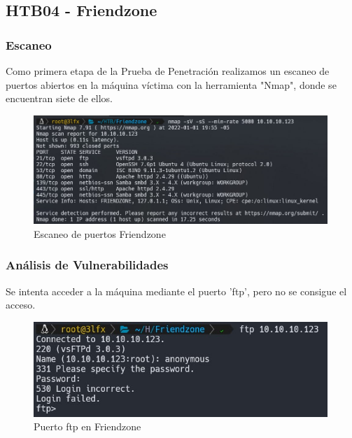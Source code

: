 \subsection{HTB04 - Friendzone}

    \subsubsection{Escaneo}
        \large{Como primera etapa de la Prueba de Penetración realizamos un escaneo de puertos abiertos en la máquina víctima con la herramienta "Nmap", donde se encuentran siete de ellos.}
        \par
        \begin{figure}[h!]
            \centering
            \includegraphics[width=0.99\textwidth]{informe4/imagenes/friendzone/01_escaneo.png}
            \caption{Escaneo de puertos Friendzone} 
        \end{figure}  

    \subsubsection{Análisis de Vulnerabilidades}
        \large{Se intenta acceder a la máquina mediante el puerto 'ftp', pero no se consigue el acceso.}
        \par
        \begin{figure}[h!]
            \centering
            \includegraphics[width=0.99\textwidth]{informe4/imagenes/friendzone/02_ftp.png}
            \caption{Puerto ftp en Friendzone} 
        \end{figure}
        
